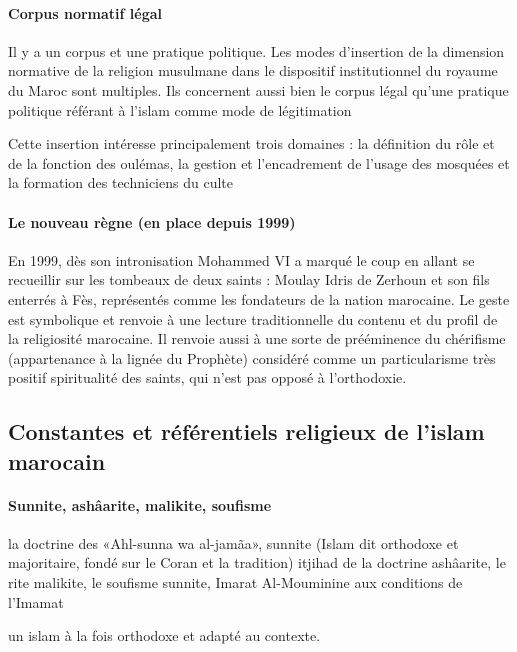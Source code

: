 
\paragraph{Corpus normatif légal} Il y a un corpus et une pratique politique. 
Les modes d'insertion de la dimension normative de la religion musulmane dans le dispositif institutionnel du royaume du Maroc sont multiples.
Ils concernent aussi bien le corpus légal qu'une pratique politique référant à l'islam comme mode de légitimation 

Cette insertion intéresse principalement trois domaines : la définition du rôle et de la fonction des oulémas, la gestion et l'encadrement de l'usage des mosquées et la formation des techniciens du culte

\paragraph{Le nouveau règne (en place depuis 1999)} En 1999,  dès son intronisation Mohammed VI a marqué le coup en allant se recueillir sur les tombeaux de deux saints : Moulay Idris de Zerhoun et son fils enterrés à Fès, représentés comme les fondateurs de la nation marocaine.
 Le geste est symbolique et renvoie à une lecture traditionnelle du contenu et du profil de la religiosité marocaine.
 Il renvoie aussi à une sorte de prééminence du chérifisme (appartenance à la lignée du Prophète) considéré comme un particularisme très positif
spiritualité des saints, qui n'est pas opposé à l'orthodoxie. 

\subsection{Constantes et référentiels religieux de l'islam marocain}

\paragraph{Sunnite, ashâarite, malikite, soufisme}
la doctrine des «Ahl-sunna wa al-jamãa»,  sunnite (Islam dit orthodoxe et majoritaire, fondé sur le Coran et la tradition) itjihad de la doctrine ashâarite, le rite malikite,  le soufisme sunnite,  Imarat Al-Mouminine aux conditions de l'Imamat

  un islam à la fois orthodoxe et adapté au contexte.
